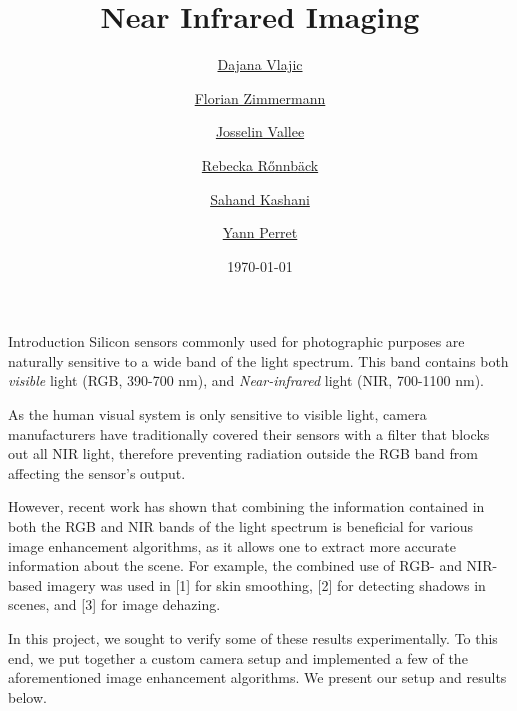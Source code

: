 \documentclass[11pt]{article}
\title{Near Infrared Imaging}
\author{
    \href{mailto:dajana.vlajic@epfl.ch}{Dajana Vlajic} \and
    \href{mailto:florian.zimmermann@epfl.ch}{Florian Zimmermann} \and
    \href{mailto:josselin.vallee@epfl.ch}{Josselin Vallee} \and
    \href{mailto:rebecka.ronnback@epfl.ch}{Rebecka R{\H o}nnb{\"a}ck} \and
    \href{mailto:sahand.kashani-akhavan@epfl.ch}{Sahand Kashani} \and
    \href{mailto:yann.perret@epfl.ch}{Yann Perret}
}
\date{\today}
\begin{document}
\maketitle

\begin{section}{Introduction}
    \label{sec:introduction}
    Silicon sensors commonly used for photographic purposes are naturally sensitive to a wide band of the light spectrum. This band contains both \emph{visible} light (RGB, 390-700 nm), and \emph{Near-infrared} light (NIR, 700-1100 nm).

    \medskip

    As the human visual system is only sensitive to visible light, camera manufacturers have traditionally covered their sensors with a filter that blocks out all NIR light, therefore preventing radiation outside the RGB band from affecting the sensor's output.

    \medskip

    However, recent work has shown that combining the information contained in both the RGB and NIR bands of the light spectrum is beneficial for various image enhancement algorithms, as it allows one to extract more accurate information about the scene. For example, the combined use of RGB- and NIR-based imagery was used in [1] for skin smoothing, [2] for detecting shadows in scenes, and [3] for image dehazing.

    \medskip

    In this project, we sought to verify some of these results experimentally. To this end, we put together a custom camera setup and implemented a few of the aforementioned image enhancement algorithms. We present our setup and results below.

\end{section}

\end{document}
